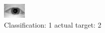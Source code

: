 \begin{figure}[h!]
\begin{center}
\includegraphics[width=0.60\columnwidth]{figures/ID921_class_1_target_2.png}
\end{center}
\caption{ Classification: 1 actual target: 2}
\label{fig:ID921_class_1_target_2}
\end{figure}
